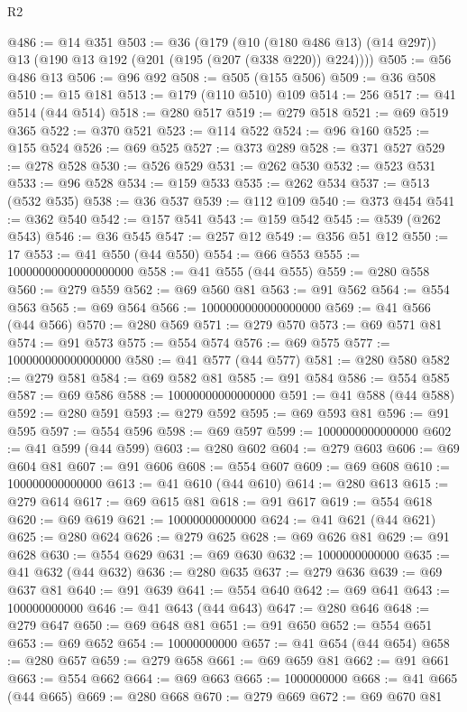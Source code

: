 \begin{lexlean}{R2}
\begin{coremodule}
{{{{{{{{{{{{{{{{{{{{{{{{{{{{{{{{{{{{{{{{{{{{{{@486 := @14 @351
@503 := @36
    (@179
      (@10 (@180 @486 @13) (@14 @297))
      @13
      (@190 @13 @192 (@201 (@195 (@207 (@338 @220)) @224))))
@505 := @56 @486 @13
@506 := @96 @92
@508 := @505 (@155 @506)
@509 := @36 @508
@510 := @15 @181
@513 := @179 (@110 @510) @109
@514 := 256
@517 := @41 @514 (@44 @514)
@518 := @280 @517
@519 := @279 @518
@521 := @69 @519 @365
@522 := @370 @521
@523 := @114 @522
@524 := @96 @160
@525 := @155 @524
@526 := @69 @525
@527 := @373 @289
@528 := @371 @527
@529 := @278 @528
@530 := @526 @529
@531 := @262 @530
@532 := @523 @531
@533 := @96 @528
@534 := @159 @533
@535 := @262 @534
@537 := @513 (@532 @535)
@538 := @36 @537
@539 := @112 @109
@540 := @373 @454
@541 := @362 @540
@542 := @157 @541
@543 := @159 @542
@545 := @539 (@262 @543)
@546 := @36 @545
@547 := @257 @12
@549 := @356 @51 @12
@550 := 17
@553 := @41 @550 (@44 @550)
@554 := @66 @553
@555 := 10000000000000000000
@558 := @41 @555 (@44 @555)
@559 := @280 @558
@560 := @279 @559
@562 := @69 @560 @81
@563 := @91 @562
@564 := @554 @563
@565 := @69 @564
@566 := 1000000000000000000
@569 := @41 @566 (@44 @566)
@570 := @280 @569
@571 := @279 @570
@573 := @69 @571 @81
@574 := @91 @573
@575 := @554 @574
@576 := @69 @575
@577 := 100000000000000000
@580 := @41 @577 (@44 @577)
@581 := @280 @580
@582 := @279 @581
@584 := @69 @582 @81
@585 := @91 @584
@586 := @554 @585
@587 := @69 @586
@588 := 10000000000000000
@591 := @41 @588 (@44 @588)
@592 := @280 @591
@593 := @279 @592
@595 := @69 @593 @81
@596 := @91 @595
@597 := @554 @596
@598 := @69 @597
@599 := 1000000000000000
@602 := @41 @599 (@44 @599)
@603 := @280 @602
@604 := @279 @603
@606 := @69 @604 @81
@607 := @91 @606
@608 := @554 @607
@609 := @69 @608
@610 := 100000000000000
@613 := @41 @610 (@44 @610)
@614 := @280 @613
@615 := @279 @614
@617 := @69 @615 @81
@618 := @91 @617
@619 := @554 @618
@620 := @69 @619
@621 := 10000000000000
@624 := @41 @621 (@44 @621)
@625 := @280 @624
@626 := @279 @625
@628 := @69 @626 @81
@629 := @91 @628
@630 := @554 @629
@631 := @69 @630
@632 := 1000000000000
@635 := @41 @632 (@44 @632)
@636 := @280 @635
@637 := @279 @636
@639 := @69 @637 @81
@640 := @91 @639
@641 := @554 @640
@642 := @69 @641
@643 := 100000000000
@646 := @41 @643 (@44 @643)
@647 := @280 @646
@648 := @279 @647
@650 := @69 @648 @81
@651 := @91 @650
@652 := @554 @651
@653 := @69 @652
@654 := 10000000000
@657 := @41 @654 (@44 @654)
@658 := @280 @657
@659 := @279 @658
@661 := @69 @659 @81
@662 := @91 @661
@663 := @554 @662
@664 := @69 @663
@665 := 1000000000
@668 := @41 @665 (@44 @665)
@669 := @280 @668
@670 := @279 @669
@672 := @69 @670 @81
}}}}}}}}}}}}}}}}}}}}}}}}}}}}}}}}}}}}}}}}}}}}}}
\end{coremodule}
\end{lexlean}
